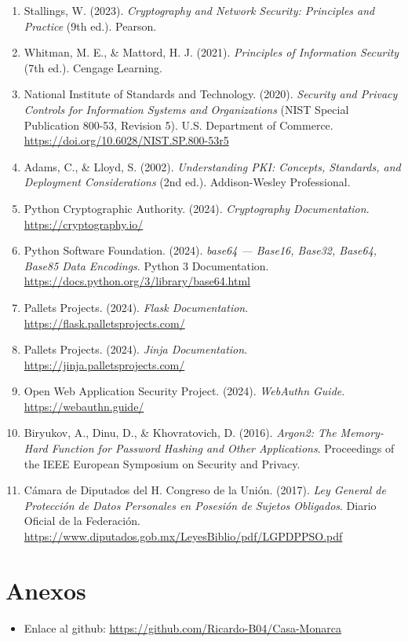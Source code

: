 \documentclass[10pt, letterpaper]{article}
\begin{document}
\begin{enumerate}

\item Stallings, W. (2023). \textit{Cryptography and Network Security: Principles and Practice} (9th ed.). Pearson.

\item Whitman, M. E., \& Mattord, H. J. (2021). \textit{Principles of Information Security} (7th ed.). Cengage Learning.

\item National Institute of Standards and Technology. (2020). \textit{Security and Privacy Controls for Information Systems and Organizations} (NIST Special Publication 800-53, Revision 5). U.S. Department of Commerce. \url{https://doi.org/10.6028/NIST.SP.800-53r5}

\item Adams, C., \& Lloyd, S. (2002). \textit{Understanding PKI: Concepts, Standards, and Deployment Considerations} (2nd ed.). Addison-Wesley Professional.

\item Python Cryptographic Authority. (2024). \textit{Cryptography Documentation}. \url{https://cryptography.io/}

\item Python Software Foundation. (2024). \textit{base64 --- Base16, Base32, Base64, Base85 Data Encodings}. Python 3 Documentation. \url{https://docs.python.org/3/library/base64.html}

\item Pallets Projects. (2024). \textit{Flask Documentation}. \url{https://flask.palletsprojects.com/}

\item Pallets Projects. (2024). \textit{Jinja Documentation}. \url{https://jinja.palletsprojects.com/}

\item Open Web Application Security Project. (2024). \textit{WebAuthn Guide}. \url{https://webauthn.guide/}

\item Biryukov, A., Dinu, D., \& Khovratovich, D. (2016). \textit{Argon2: The Memory-Hard Function for Password Hashing and Other Applications}. Proceedings of the IEEE European Symposium on Security and Privacy.

\item Cámara de Diputados del H. Congreso de la Unión. (2017). \textit{Ley General de Protección de Datos Personales en Posesión de Sujetos Obligados}. Diario Oficial de la Federación. \url{https://www.diputados.gob.mx/LeyesBiblio/pdf/LGPDPPSO.pdf}

\end{enumerate}

\section{Anexos}

\begin{itemize}

\item
Enlace al github: \url{https://github.com/Ricardo-B04/Casa-Monarca}
\end{itemize}
\end{document}
